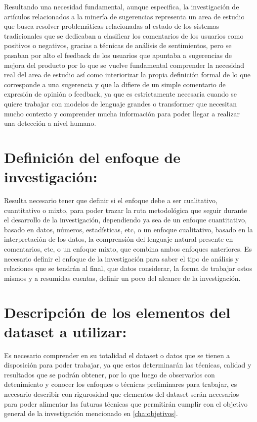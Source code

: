 Resultando una necesidad fundamental, aunque especifica, la investigación de artículos relacionados a la minería de sugerencias representa un area de estudio que busca resolver problemáticas relacionadas al estado de los sistemas tradicionales que se dedicaban a clasificar los comentarios de los usuarios como positivos o negativos, gracias a técnicas de análisis de sentimientos, pero se pasaban por alto el feedback de los usuarios que apuntaba a sugerencias de mejora del producto \textcite{SuggestionMiningDictionary} por lo que se vuelve fundamental comprender la necesidad real del area de estudio así como interiorizar la propia definición formal de lo que corresponde a una sugerencia y que la difiere de un simple comentario de expresión de opinión o feedback, ya que es estrictamente necesaria cuando se quiere trabajar con modelos de lenguaje grandes o transformer que necesitan mucho contexto y comprender mucha información para poder llegar a realizar una detección a nivel humano.

\section{\textbf{Definición del enfoque de investigación:}}

Resulta necesario tener que definir si el enfoque debe a ser cualitativo, cuantitativo o mixto, para poder trazar la ruta metodológica que seguir durante el desarrollo de la investigación, dependiendo ya sea de un enfoque cuantitativo, basado en datos, números, estadísticas, etc, o un enfoque cualitativo, basado en la interpretación de los datos, la comprensión del lenguaje natural presente en comentarios, etc, o un enfoque mixto, que combina ambos enfoques anteriores. Es necesario definir el enfoque de la investigación para saber el tipo de análisis y relaciones que se tendrán al final, que datos considerar, la forma de trabajar estos mismos y a resumidas cuentas, definir un poco del alcance de la investigación.

\section{\textbf{Descripción de los elementos del dataset a utilizar:}}

Es necesario comprender en su totalidad el dataset o datos que se tienen a disposición para poder trabajar, ya que estos determinarán las técnicas, calidad y resultados que se podrán obtener, por lo que luego de observarlos con detenimiento y conocer los enfoques o técnicas preliminares para trabajar, es necesario describir con rigurosidad que elementos del dataset serán necesarios para poder alimentar las futuras técnicas que permitirán cumplir con el objetivo general de la investigación mencionado en \ref{cha:objetivos}.

